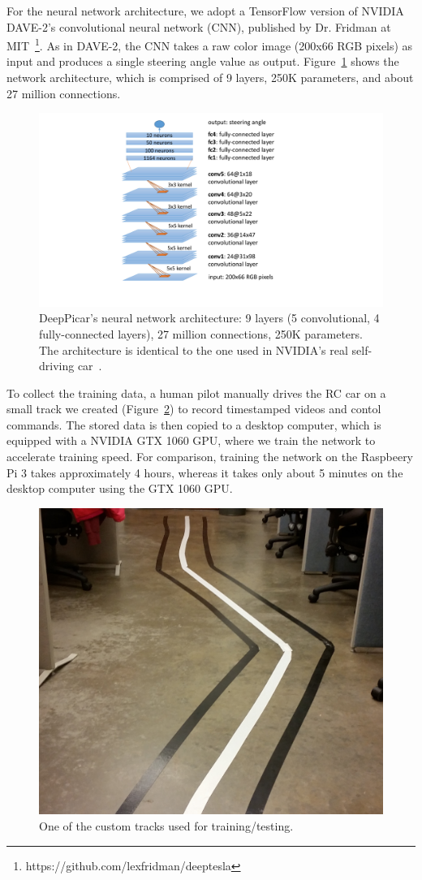 For the neural network architecture, we adopt a TensorFlow version of
NVIDIA DAVE-2's convolutional neural network (CNN), published by Dr.
Fridman at  MIT~\footnote{https://github.com/lexfridman/deeptesla}. As
in DAVE-2, the CNN takes a raw color image (200x66 RGB pixels)
as input and produces a single steering angle value as
output. Figure~\ref{fig:architecture} shows the network architecture, which
is comprised of 9 layers, 250K parameters, and about 27 million
connections.

\begin{figure}[t]
  \centering
  \includegraphics[width=.6\textwidth]{figs/architecture}
  \caption{DeepPicar's neural network architecture: 9 layers (5
    convolutional, 4 fully-connected layers), 27 million connections,
    250K parameters. The architecture is identical to the one used
    in NVIDIA's real self-driving car~\cite{Bojarski2016}.}
  \label{fig:architecture}
\end{figure}

To collect the training data, a human pilot manually drives the RC car
on a small track we created (Figure~\ref{fig:track}) to record
timestamped videos and contol commands. The stored data is then copied 
to a desktop computer, which is equipped with a NVIDIA GTX 1060 GPU, 
where we train the network to accelerate training speed. 
For comparison, training the network on the Raspbeery Pi 3 takes
approximately 4 hours, whereas it takes only about 5 minutes on the
desktop computer using the GTX 1060 GPU.

\begin{figure}[t]
  \centering
  \includegraphics[width=.65\textwidth]{figs/track_new2}
  \caption{One of the custom tracks used for training/testing.}
  \label{fig:track}
\end{figure}

